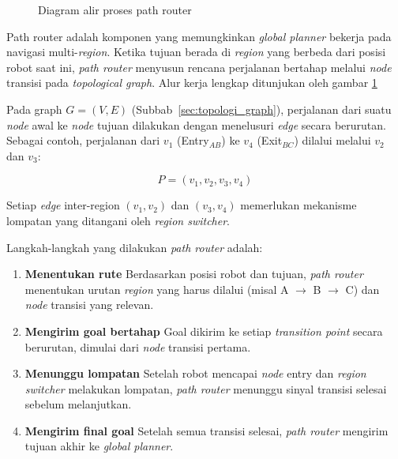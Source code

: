 \begin{figure}[H]
\centering

\caption{Diagram alir proses path router}
\label{fig:path_router_flow}
\end{figure}

Path router adalah komponen yang memungkinkan \emph{global planner}
bekerja pada navigasi multi-\emph{region}. Ketika tujuan berada di
\emph{region} yang berbeda dari posisi robot saat ini, \emph{path
router} menyusun rencana perjalanan bertahap melalui \emph{node}
transisi pada \emph{topological graph}. Alur kerja lengkap ditunjukan oleh gambar \ref{fig:path_router_flow}

Pada graph $G = (V, E)$ (Subbab~\ref{sec:topologi_graph}), perjalanan
dari suatu \emph{node} awal ke \emph{node} tujuan dilakukan dengan
menelusuri \emph{edge} secara berurutan. Sebagai contoh, perjalanan
dari $v_1$ (Entry$_{AB}$) ke $v_4$ (Exit$_{BC}$) dilalui melalui
$v_2$ dan $v_3$:

\begin{equation}
P = (v_1, v_2, v_3, v_4)
\end{equation}

Setiap \emph{edge} inter-region $(v_1, v_2)$ dan $(v_3, v_4)$
memerlukan mekanisme lompatan yang ditangani oleh \emph{region
switcher}.

Langkah-langkah yang dilakukan \emph{path router} adalah:
\begin{enumerate}
  \item \textbf{Menentukan rute} \newline Berdasarkan posisi robot dan
  tujuan, \emph{path router} menentukan urutan \emph{region} yang
  harus dilalui (misal A $\to$ B $\to$ C) dan \emph{node} transisi
  yang relevan.
  \item \textbf{Mengirim goal bertahap} \newline Goal dikirim ke setiap
  \emph{transition point} secara berurutan, dimulai dari \emph{node}
  transisi pertama.
  \item \textbf{Menunggu lompatan} \newline Setelah robot mencapai \emph{node}
  entry dan \emph{region switcher} melakukan lompatan, \emph{path
  router} menunggu sinyal transisi selesai sebelum
  melanjutkan.
  \item \textbf{Mengirim final goal} \newline Setelah semua transisi selesai,
  \emph{path router} mengirim tujuan akhir ke \emph{global planner}.
\end{enumerate}

